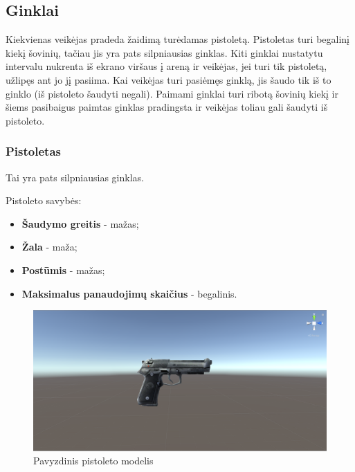 \documentclass{VUMIFPSkursinis}
\begin{document}
\subsection{Ginklai}
Kiekvienas veikėjas pradeda žaidimą turėdamas pistoletą. Pistoletas turi begalinį kiekį šovinių, tačiau jis yra pats silpniausias ginklas. Kiti ginklai nustatytu intervalu nukrenta iš ekrano viršaus į areną ir veikėjas, jei turi tik pistoletą, užlipęs ant jo jį pasiima. Kai veikėjas turi pasiėmęs ginklą, jis šaudo tik iš to ginklo (iš pistoleto šaudyti negali). Paimami ginklai turi ribotą šovinių kiekį ir šiems pasibaigus paimtas ginklas pradingsta ir veikėjas toliau gali šaudyti iš pistoleto.


\subsubsection{Pistoletas}
Tai yra pats silpniausias ginklas.

Pistoleto savybės:
\begin{itemize}
    \item \textbf{Šaudymo greitis} - mažas;
    \item \textbf{Žala} - maža;
    \item \textbf{Postūmis} - mažas;
    \item \textbf{Maksimalus panaudojimų skaičius} - begalinis.
\end{itemize}

\begin{figure}[H]
    \centering
    \includegraphics[scale=0.3]{img/Weapons/Pistol.png}
    \caption{Pavyzdinis pistoleto modelis}
    \label{img:pistol}
\end{figure}
\end{document}
